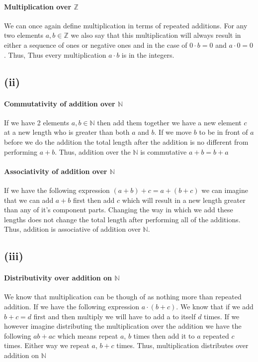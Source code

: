 \documentclass{article}
\begin{document}
      \paragraph{Multiplication over $\mathbb{Z}$}
      We can once again define multiplication in terms of repeated additions. For any two elements $a,b \in \mathbb{Z}$ we also say that this multiplication will always result in either a sequence of ones or negative ones and in the case of $0 \cdot b = 0$ and $a \cdot 0 = 0$. Thus, Thus every multiplication $a \cdot b$ is in the integers.
      
    \subsection*{(ii)}
      \paragraph{Commutativity of addition over $\mathbb{N}$}
      If we have 2 elements $a,b \in \mathbb{N}$ then add them together we have a new element $c$ at a new length who is greater than both $a$ and $b$. If we move $b$ to be in front of $a$ before we do the addition the total length after the addition is no different from performing $a + b$. Thus, addition over the $\mathbb{N}$ is commutative $a+b = b+a$
      
      \paragraph{Associativity of addition over $\mathbb{N}$}
      If we have the following expression $(a+b) + c = a+ (b+c)$ we can imagine that we can add $a+b$ first then add $c$ which will result in a new length greater than any of it's component parts. Changing the way in which we add these lengths does not change the total length after performing all of the additions. Thus, addition is associative of addition over $\mathbb{N}$.

    \subsection*{(iii)}
      \paragraph{Distributivity over addition on $\mathbb{N}$}
      We know that multiplication can be though of as nothing more than repeated addition. If we have the following expression $a \cdot (b+c)$. We know that if we add $b+c = d$ first and then multiply we will have to add a to itself $d$ times. If we however imagine distributing the multiplication over the addition we have the following $ab + ac$ which means repeat $a$, $b$ times then add it to $a$ repeated $c$ times. Either way we repeat $a$, $b+c$ times. Thus, multiplication distributes over addition on $\mathbb{N}$
    
\end{document}
